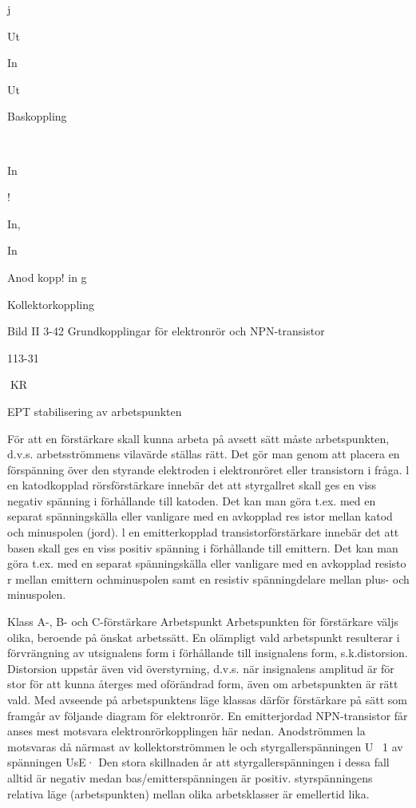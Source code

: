 j

Ut

In

Ut

Baskoppling

~

In

!

In,

In

Anod kopp! in g

Kollektorkoppling

Bild II 3-42 Grundkopplingar för elektronrör och NPN-transistor

113-31

KR

EPT
stabilisering av arbetspunkten

För att en förstärkare skall kunna arbeta på
avsett sätt måste arbetspunkten, d.v.s.
arbetsströmmens vilavärde ställas rätt.
Det gör man genom att placera en förspänning över den styrande elektroden i
elektronröret eller transistorn i fråga.
l en katodkopplad rörsförstärkare innebär det att styrgallret skall ges en viss negativ spänning i förhållande till katoden. Det
kan man göra t.ex. med en separat spänningskälla eller vanligare med en avkopplad
res istor mellan katod och minuspolen (jord).
l en emitterkopplad transistorförstärkare
innebär det att basen skall ges en viss positiv
spänning i förhållande till emittern. Det kan
man göra t.ex. med en separat spänningskälla eller vanligare med en avkopplad resisto r mellan emittern ochminuspolen samt en
resistiv spänningdelare mellan plus- och
minuspolen.

Klass A-, B- och C-förstärkare
Arbetspunkt
Arbetspunkten för förstärkare väljs olika,
beroende på önskat arbetssätt. En olämpligt
vald arbetspunkt resulterar i förvrängning av
utsignalens form i förhållande till insignalens
form, s.k.distorsion. Distorsion uppstår även
vid överstyrning, d.v.s. när insignalens amplitud är för stor för att kunna återges med
oförändrad form, även om arbetspunkten är
rätt vald.
Med avseende på arbetspunktens läge
klassas därför förstärkare på sätt som framgår av följande diagram för elektronrör. En
emitterjordad NPN-transistor får anses mest
motsvara elektronrörkopplingen här nedan.
Anodströmmen la motsvaras då närmast av
kollektorströmmen le och styrgallerspänningen U~ 1 av spänningen UsE· Den stora skillnaden år att styrgallerspänningen i dessa fall
alltid är negativ medan bas/emitterspänningen är positiv. styrspänningens relativa läge
(arbetspunkten) mellan olika arbetsklasser
är emellertid lika.

